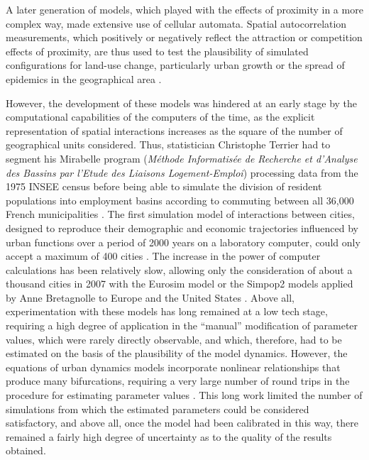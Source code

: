 \documentclass[10pt]{article}
\begin{document}
A later generation of models, which played with the effects of proximity in a more complex way, made extensive use of cellular automata. Spatial autocorrelation measurements, which positively or negatively reflect the attraction or competition effects of proximity, are thus used to test the plausibility of simulated configurations for land-use change, particularly urban growth \citep{white1993cellular,white2015modeling} or the spread of epidemics in the geographical area \citep{cliff2004world}.


However, the development of these models was hindered at an early stage by the computational capabilities of the computers of the time, as the explicit representation of spatial interactions increases as the square of the number of geographical units considered. Thus, statistician Christophe Terrier had to segment his Mirabelle program (\textit{M{\'e}thode Informatis{\'e}e de Recherche et d'Analyse des Bassins par l'Etude des Liaisons Logement-Emploi}) processing data from the 1975 INSEE census before being able to simulate the division of resident populations into employment basins according to commuting between all 36,000 French municipalities \citep{terrier1980mirabelle}. The first simulation model of interactions between cities, designed to reproduce their demographic and economic trajectories influenced by urban functions over a period of 2000 years on a laboratory computer, could only accept a maximum of 400 cities \citep{bura1996multiagent,sanders1997simpop}. The increase in the power of computer calculations has been relatively slow, allowing only the consideration of about a thousand cities in 2007 with the Eurosim model \citep{sanders2007artificial} or the Simpop2 models applied by Anne Bretagnolle to Europe and the United States \citep{bretagnolle2010simulating}. Above all, experimentation with these models has long remained at a low tech stage, requiring a high degree of application in the ``manual'' modification of parameter values, which were rarely directly observable, and which, therefore, had to be estimated on the basis of the plausibility of the model dynamics. However, the equations of urban dynamics models incorporate nonlinear relationships that produce many bifurcations, requiring a very large number of round trips in the procedure for estimating parameter values \citep{sanders2007artificial}. This long work limited the number of simulations from which the estimated parameters could be considered satisfactory, and above all, once the model had been calibrated in this way, there remained a fairly high degree of uncertainty as to the quality of the results obtained.
\end{document}

